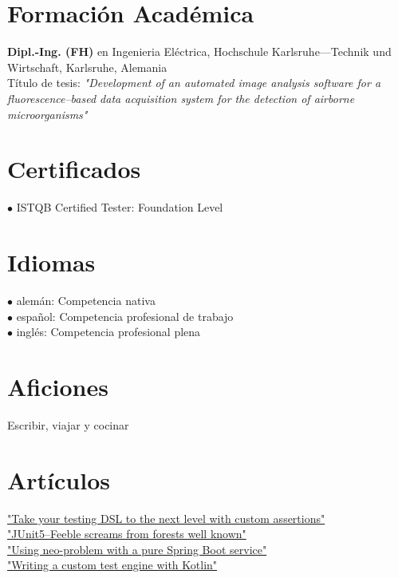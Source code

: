 \documentclass[10pt, a4paper]{article}
\newcommand{\years}[1]{\marginnote{\scriptsize #1}}
\begin{document}
\section*{Formación Académica}
\years{2009} {\bf Dipl.-Ing. (FH)} en Ingenieria Eléctrica, Hochschule Karlsruhe---Technik und Wirtschaft, Karlsruhe, Alemania\\
Título de tesis: \emph{"Development of an automated image analysis software for a fluorescence--based data acquisition system for the detection of airborne microorganisms"}

\section*{Certificados}
$\bullet$ ISTQB Certified Tester: Foundation Level

\section*{Idiomas}
$\bullet$ alemán: Competencia nativa\\
$\bullet$ español: Competencia profesional de trabajo\\
$\bullet$ inglés: Competencia profesional plena

\section*{Aficiones}
Escribir, viajar y cocinar\\

\section*{Artículos}
\years{2015} \href{https://gitlab.com/gdiegel/writing-public/blob/master/custom\_assertions.md}{"Take your testing DSL to the next level with custom assertions"}\\
\years{2016} \href{https://gitlab.com/gdiegel/writing-public/blob/master/junit5_feeble_screams_from_forests_well_known.md}{"JUnit5--Feeble screams from forests well known"}\\
\years{2017} \href{https://gitlab.com/gdiegel/writing-public/blob/master/neo\_problem\_spring.md}{"Using neo-problem with a pure Spring Boot service"}\\
\years{2018} \href{https://gitlab.com/gdiegel/writing-public/blob/master/custom\_test\_engine\_with\_kotlin.md}{"Writing a custom test engine with Kotlin"}
\end{document}
